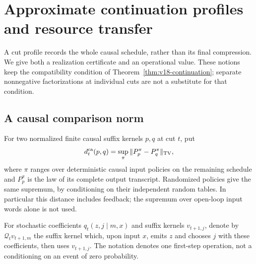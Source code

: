 \section{Approximate continuation profiles and resource transfer}
\label{sec:v21-resources}
A cut profile records the whole causal schedule, rather than its final
compression. We give both a realization certificate and an operational
value. These notions keep the compatibility condition of
Theorem~\ref{thm:v18-continuation}; separate nonnegative factorizations
at individual cuts are not a substitute for that condition.

\subsection{A causal comparison norm}
For two normalized finite causal suffix kernels $p,q$ at cut $t$, put
\[
 d_t^{\rm ca}(p,q)=\sup_\pi\|P_p^\pi-P_q^\pi\|_{\rm TV},
\]
where $\pi$ ranges over deterministic causal input policies on the
remaining schedule and $P_p^\pi$ is the law of its complete output
transcript. Randomized policies give the same supremum, by conditioning
on their independent random tables. In particular this distance includes
feedback; the supremum over open-loop input words alone is not used.

For stochastic coefficients $q_t(z,j\mid m,x)$ and suffix kernels
$v_{t+1,j}$, denote by $\mathcal Q_t v_{t+1,m}$ the suffix kernel which,
upon input $x$, emits $z$ and chooses $j$ with these coefficients, then
uses $v_{t+1,j}$. The notation denotes one first-step operation, not a
conditioning on an event of zero probability.

